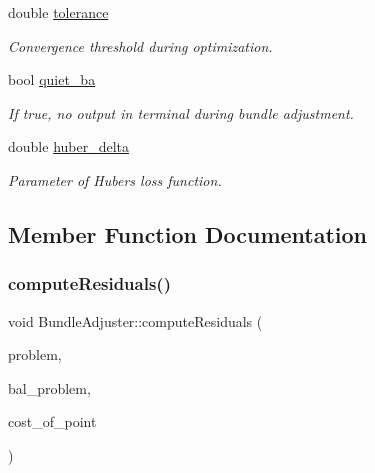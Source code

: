 \begin{DoxyCompactItemize}
\mbox{\label{classBundleAdjuster_a15dbb0662b4dff9a0569d749a1cffc0a}} 
double \hyperlink{classBundleAdjuster_a15dbb0662b4dff9a0569d749a1cffc0a}{tolerance}
\begin{DoxyCompactList}\small\item\em Convergence threshold during optimization. \end{DoxyCompactList}\item 
\mbox{\label{classBundleAdjuster_a1d066c42887fcb742bd95ecaf42ac0ed}} 
bool \hyperlink{classBundleAdjuster_a1d066c42887fcb742bd95ecaf42ac0ed}{quiet\+\_\+ba}
\begin{DoxyCompactList}\small\item\em If true, no output in terminal during bundle adjustment. \end{DoxyCompactList}\item 
\mbox{\label{classBundleAdjuster_aaa8620c07fe93536105d6b179d32eee0}} 
double \hyperlink{classBundleAdjuster_aaa8620c07fe93536105d6b179d32eee0}{huber\+\_\+delta}
\begin{DoxyCompactList}\small\item\em Parameter of Huber\textquotesingle{}s loss function. \end{DoxyCompactList}\end{DoxyCompactItemize}


\subsection{Member Function Documentation}
\mbox{\label{classBundleAdjuster_ab02856e3e01f04742f1c74350e5a31da}} 
\subsubsection{\texorpdfstring{compute\+Residuals()}{computeResiduals()}}
{\footnotesize\ttfamily void Bundle\+Adjuster\+::compute\+Residuals (\begin{DoxyParamCaption}\item[{ceres\+::\+Problem \&}]{problem,  }\item[{\hyperlink{classBALProblem}{B\+A\+L\+Problem} \&}]{bal\+\_\+problem,  }\item[{std\+::vector$<$ double $>$ \&}]{cost\+\_\+of\+\_\+point }\end{DoxyParamCaption})}



